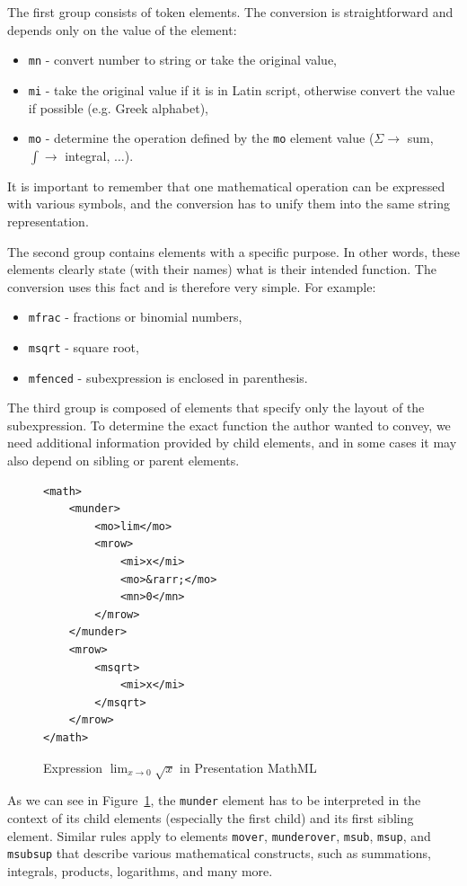 \documentclass[11pt,oneside,final]{fithesis2}
\begin{document}
The first group consists of token elements. The conversion is straightforward and depends only on the value of the element:
\begin{itemize}
\item \texttt{mn} - convert number to string or take the original value,
\item \texttt{mi} - take the original value if it is in Latin script, otherwise convert the value if possible (e.g. Greek alphabet),
\item \texttt{mo} - determine the operation defined by the \texttt{mo} element value ($\Sigma \rightarrow$ sum, $\int \rightarrow$ integral, $\ldots$).
\end{itemize}
It is important to remember that one mathematical operation can be expressed with various symbols, and the conversion has to unify them into the same string representation.

The second group contains elements with a specific purpose. In other words, these elements clearly state (with their names) what is their intended function. The conversion uses this fact and is therefore very simple. For example:
\begin{itemize}
\item \texttt{mfrac} - fractions or binomial numbers,
\item \texttt{msqrt} - square root,
\item \texttt{mfenced} - subexpression is enclosed in parenthesis.
\end{itemize}

The third group is composed of elements that specify only the layout of the subexpression. To determine the exact function the author wanted to convey, we need additional information provided by child elements, and in some cases it may also depend on sibling or parent elements. 
\begin{figure}[!ht]
\lstset{language=XML,frame=lines}
\begin{lstlisting}
<math>
	<munder>
		<mo>lim</mo>
		<mrow>
			<mi>x</mi>
			<mo>&rarr;</mo>
			<mn>0</mn>
		</mrow>		
	</munder>
	<mrow>
		<msqrt>
			<mi>x</mi>
		</msqrt>
	</mrow>
</math>
\end{lstlisting}
\caption{Expression $\lim_{x \to 0}\sqrt{x}$ in Presentation MathML}
\label{fig:mathmllimit}
\end{figure}

As we can see in Figure~\ref{fig:mathmllimit}, the \texttt{munder} element has to be interpreted in the context of its child elements (especially the first child) and its first sibling element. Similar rules apply to elements \texttt{mover}, \texttt{munderover}, \texttt{msub}, \texttt{msup}, and \texttt{msubsup} that describe various mathematical constructs, such as summations, integrals, products, logarithms, and many more.
\end{document}
